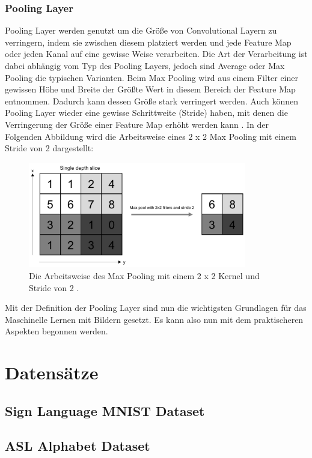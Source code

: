 \documentclass[11pt,bibliography=totocnumbered]{scrartcl}
\begin{document}
\subsubsection{Pooling Layer}
Pooling Layer werden genutzt um die Größe von Convolutional Layern zu verringern, indem sie zwischen diesem platziert werden und jede Feature Map oder jeden Kanal auf eine gewisse Weise verarbeiten. Die Art der Verarbeitung ist dabei abhängig vom Typ des Pooling Layers, jedoch sind Average oder Max Pooling die typischen Varianten. Beim Max Pooling wird aus einem Filter einer gewissen Höhe und Breite der Größte Wert in diesem Bereich der Feature Map entnommen. Dadurch kann dessen Größe stark verringert werden. Auch können Pooling Layer wieder eine gewisse Schrittweite (Stride) haben, mit denen die Verringerung der Größe einer Feature Map erhöht werden kann \cite[S.18-19]{DEEP_LEARNING_CV}\cite[S.369-370]{MACHINE_LEARNING}. In der Folgenden Abbildung wird die Arbeitsweise eines 2 x 2 Max Pooling mit einem Stride von 2 dargestellt: 
\begin{figure}[H]
	\centering
	\includegraphics[width=0.85\textwidth]{pooling}
	\vspace*{-3mm}
	\caption[Arbeitsweise des Max Pooling]{Die Arbeitsweise des Max Pooling mit einem 2 x 2 Kernel und Stride von 2 \cite[S.19]{DEEP_LEARNING_CV}.}
	\label{fig:pooling}
\end{figure}
\vspace*{-5mm}
Mit der Definition der Pooling Layer sind nun die wichtigsten Grundlagen für das Maschinelle Lernen mit Bildern gesetzt. Es kann also nun mit dem praktischeren Aspekten begonnen werden.
\section{Datensätze}
\subsection{Sign Language MNIST Dataset}
\subsection{ASL Alphabet Dataset}
\end{document}
